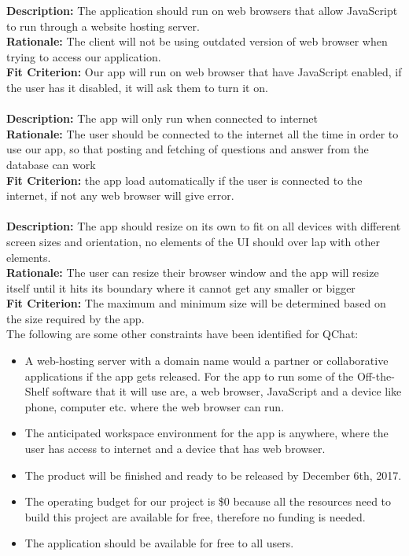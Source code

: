 \documentclass[12pt, titlepage]{article}
\begin{document}
\textbf{Description:} The application should run on web browsers that allow JavaScript to run through a website hosting server.
\\
\textbf{Rationale:} The client will not be using outdated version of web browser when trying to access our application. 
\\
\textbf{Fit Criterion:} Our app will run on web browser that have JavaScript enabled, if the user has it disabled, it will ask them to turn it on. 
\\
\\
\textbf{Description:} The app will only run when connected to internet
\\
\textbf{Rationale:} The user should be connected to the internet all the time in order to use our app, so that posting and fetching of questions and answer from the database can work
\\
\textbf{Fit Criterion:} the app load automatically if the user is connected to the internet, if not any web browser will give error.
\\
\\
\textbf{Description:} The app should resize on its own to fit on all devices with different screen sizes and orientation, no elements of the UI should over lap with other elements. 
\\
\textbf{Rationale:} The user can resize their browser window and the app will resize itself until it hits its boundary where it cannot get any smaller or bigger
\\
\textbf{Fit Criterion:} The maximum and minimum size will be determined based on the size required by the app.
\\

The following are some other constraints have been identified for QChat: 

\begin{itemize}
  \item A web-hosting server with a domain name would a partner or collaborative applications if the app gets released. 
For the app to run some of the Off-the-Shelf software that it will use are, a web browser, JavaScript and a device like phone, computer etc. where the web browser can run.
  \item The anticipated workspace environment for the app is anywhere, where the user has access to internet and a device that has web browser.
  \item The product will be finished and ready to be released by December 6th, 2017.
  \item The operating budget for our project is \$0 because all the resources need to build this project are available for free, therefore no funding is needed.
  \item The application should be available for free to all users.
\end{itemize}
\end{document}
